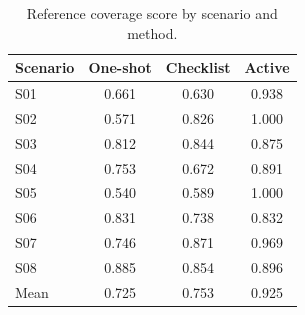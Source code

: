 \begin{table}[!htbp]
\caption{Reference coverage score by scenario and method.}
\label{tab:scenario-coverage}
\centering
\small
\begin{tabular}{lccc}
\toprule
Scenario & One-shot & Checklist & Active \\
\midrule
S01 & 0.661 & 0.630 & 0.938 \\
S02 & 0.571 & 0.826 & 1.000 \\
S03 & 0.812 & 0.844 & 0.875 \\
S04 & 0.753 & 0.672 & 0.891 \\
S05 & 0.540 & 0.589 & 1.000 \\
S06 & 0.831 & 0.738 & 0.832 \\
S07 & 0.746 & 0.871 & 0.969 \\
S08 & 0.885 & 0.854 & 0.896 \\
\midrule
Mean & 0.725 & 0.753 & 0.925 \\
\bottomrule
\end{tabular}
\end{table}
